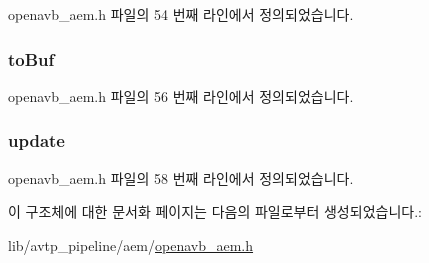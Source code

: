 openavb\+\_\+aem.\+h 파일의 54 번째 라인에서 정의되었습니다.

\subsubsection[{\texorpdfstring{to\+Buf}{toBuf}}]{ to\+Buf}\hypertarget{structopenavb__descriptor__pvt_a7a025a3804f70d8776e39e69c277300c}{}\label{structopenavb__descriptor__pvt_a7a025a3804f70d8776e39e69c277300c}


openavb\+\_\+aem.\+h 파일의 56 번째 라인에서 정의되었습니다.

\subsubsection[{\texorpdfstring{update}{update}}]{ update}\hypertarget{structopenavb__descriptor__pvt_a798693967df3e47c6418fb2a42ad6e43}{}\label{structopenavb__descriptor__pvt_a798693967df3e47c6418fb2a42ad6e43}


openavb\+\_\+aem.\+h 파일의 58 번째 라인에서 정의되었습니다.



이 구조체에 대한 문서화 페이지는 다음의 파일로부터 생성되었습니다.\+:\begin{DoxyCompactItemize}
\item 
lib/avtp\+\_\+pipeline/aem/\hyperlink{openavb__aem_8h}{openavb\+\_\+aem.\+h}\end{DoxyCompactItemize}
